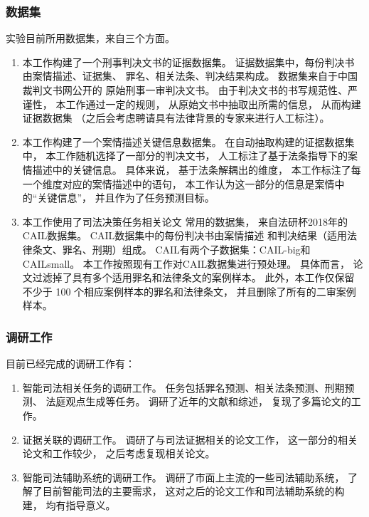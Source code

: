 \subsubsection{数据集}
实验目前所用数据集，来自三个方面。
\begin{enumerate}
    \item
          本工作构建了一个刑事判决文书的证据数据集。
          证据数据集中，每份判决书由案情描述、证据集、
          罪名、相关法条、判决结果构成。
          数据集来自于中国裁判文书网公开的
          原始刑事一审判决文书。
          由于判决文书的书写规范性、严谨性，
          本工作通过一定的规则，
          从原始文书中抽取出所需的信息，
          从而构建证据数据集
          （之后会考虑聘请具有法律背景的专家来进行人工标注）。
    \item
          本工作构建了一个案情描述关键信息数据集。
          在自动抽取构建的证据数据集中，
          本工作随机选择了一部分的判决文书，
          人工标注了基于法条指导下的案情描述中的关键信息。
          具体来说，
          基于法条解耦出的维度，
          本工作标注了每一个维度对应的案情描述中的语句，
          本工作认为这一部分的信息是案情中的“关键信息”，
          并且作为了任务预测目标。
    \item
          本工作使用了司法决策任务相关论文
          常用的数据集，
          来自法研杯2018年的CAIL数据集。
          CAIL数据集中的每份判决书由案情描述
          和判决结果（适用法律条文、罪名、刑期）组成。
          CAIL有两个子数据集：CAIL-big和CAILsmall。
          本工作按照现有工作对CAIL数据集进行预处理。
          具体而言，
          论文过滤掉了具有多个适用罪名和法律条文的案例样本。
          此外，本工作仅保留不少于 100 个相应案例样本的罪名和法律条文，
          并且删除了所有的二审案例样本。

\end{enumerate}
\subsubsection{调研工作}

目前已经完成的调研工作有：
\begin{enumerate}
      \item
            智能司法相关任务的调研工作。
            任务包括罪名预测、相关法条预测、刑期预测、
            法庭观点生成等任务。
            调研了近年的文献和综述，
            复现了多篇论文的工作。
      \item
            证据关联的调研工作。
            调研了与司法证据相关的论文工作，
            这一部分的相关论文和工作较少，
            之后考虑复现相关论文。
      \item
            智能司法辅助系统的调研工作。
            调研了市面上主流的一些司法辅助系统，
            了解了目前智能司法的主要需求，
            这对之后的论文工作和司法辅助系统的构建，
            均有指导意义。
  
  \end{enumerate}

